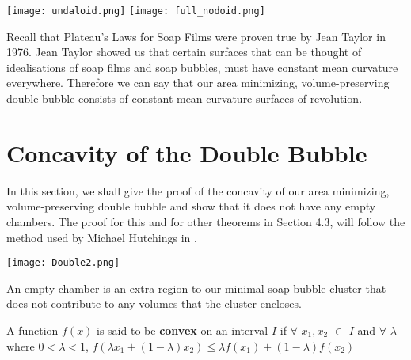 \documentclass[a4paper,12pt]{report}
\begin{document}
\begin{center}
\texttt{[image: undaloid.png]}
\hspace{1cm}
\texttt{[image: full\_nodoid.png]}
\vspace{-1cm}
\begin{multicols}{2}
\vspace{1cm}
\end{multicols}
\end{center}

Recall that Plateau's Laws for Soap Films were proven true by Jean Taylor in 1976. Jean Taylor showed us that certain surfaces that can be thought of idealisations of soap films and soap bubbles, must have constant mean curvature everywhere. Therefore we can say that our area minimizing, volume-preserving double bubble consists of constant mean curvature surfaces of revolution.

\section{Concavity of the Double Bubble}

In this section, we shall give the proof of  the concavity of our area minimizing, volume-preserving double bubble and show that it does not have any empty chambers. The proof for this and for other theorems in Section 4.3, will follow the method used by Michael Hutchings in \cite{hutchings}. 

\begin{center}
\texttt{[image: Double2.png]}
\end{center}

\begin{definition}
An empty chamber is an extra region to our minimal soap bubble cluster that does not contribute to any volumes that the cluster encloses.
\end{definition}

\begin{definition}
A function $f(x)$ is said to be \textbf{convex} on an interval $I$ if $\forall$ $x_{1},x_{2}$ $\in$ $I$ and $\forall$ $\lambda$ where $0 < \lambda < 1$, $f(\lambda x_{1} + (1-\lambda)x_{2}) \leq \lambda f(x_{1}) + (1-\lambda)f(x_{2})$
\end{definition}
\end{document}
